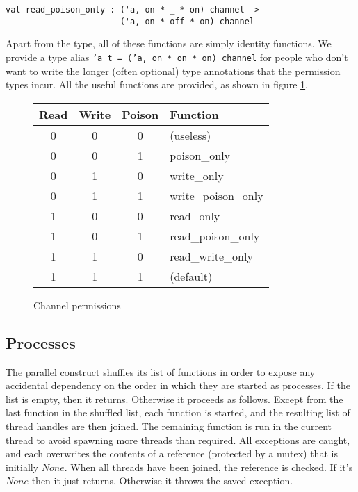 \documentclass[a4paper,12pt]{article}
\begin{document}
\begin{verbatim}
val read_poison_only : ('a, on * _ * on) channel -> 
                       ('a, on * off * on) channel
\end{verbatim}

Apart from the type, all of these functions are simply identity functions. We provide a
type alias \texttt{'a t = ('a, on * on * on) channel} for people who don't want to write the
longer (often optional) type annotations that the permission types incur. All
the useful functions are provided, as shown in figure \ref{channel-permissions}.

\begin{figure}[h]
\centering
\begin{tabular}{c|c|c|l}
Read & Write & Poison & Function \\
\hline
0 & 0 & 0 & (useless) \\
0 & 0 & 1 & poison\_only \\
0 & 1 & 0 & write\_only \\
0 & 1 & 1 & write\_poison\_only \\
1 & 0 & 0 & read\_only \\
1 & 0 & 1 & read\_poison\_only \\
1 & 1 & 0 & read\_write\_only \\
1 & 1 & 1 & (default) \\
\end{tabular}
\caption{Channel permissions}
\label{channel-permissions}
\end{figure}

\subsection{Processes}

The parallel construct shuffles its list of functions in order to expose any
accidental dependency on the order in which they are started as processes.
If the list is empty, then it returns. Otherwise it proceeds as follows.
Except from the last function in the shuffled list, each function is started,
and the resulting list of thread handles are then joined. The remaining
function is run in the current thread to avoid spawning more threads than
required. All exceptions are caught, and each overwrites the contents of a
reference (protected by a mutex) that is initially $None$. When all threads have
been joined, the reference is checked. If it's $None$ then it just returns.
Otherwise it throws the saved exception.
\end{document}
